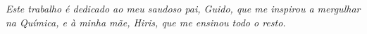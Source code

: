 \documentclass[
	12pt,				%
	openright,			%
	twoside,			%
	a4paper,			%
	english,			%
	brazil%
	]{abntex2}
\begin{document}
\begin{folhadeaprovacao}
	\vspace*{\fill}
		
        

%
%      

%	
  
\end{folhadeaprovacao}

\begin{dedicatoria}
   \vspace*{\fill}
   \centering
   \noindent
   \textit{
   	Este trabalho é dedicado ao meu saudoso pai, Guido, que me inspirou a mergulhar na Química, e à minha mãe, Hiris, que me ensinou todo o resto.   
} \vspace*{\fill}
\end{dedicatoria}
\end{document}
